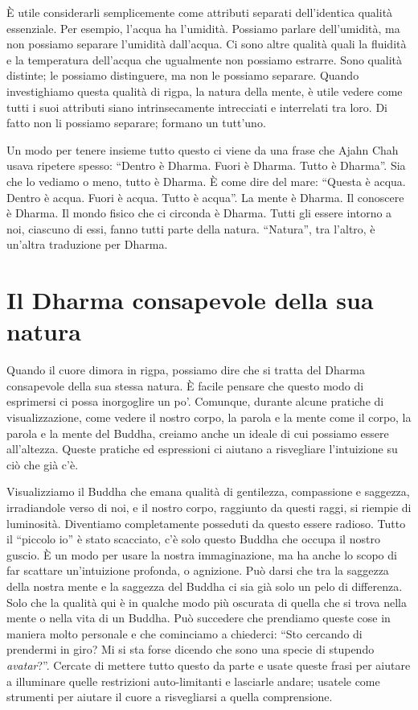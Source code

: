 È utile considerarli semplicemente come attributi separati dell'identica qualità essenziale. Per esempio, l'acqua ha l'umidità. Possiamo parlare dell'umidità, ma non possiamo separare l'umidità dall'acqua. Ci sono altre qualità quali la fluidità e la temperatura dell'acqua che ugualmente non possiamo estrarre. Sono qualità distinte; le possiamo distinguere, ma non le possiamo separare. Quando investighiamo questa qualità di rigpa, la natura della mente, è utile vedere come tutti i suoi attributi siano intrinsecamente intrecciati e interrelati tra loro. Di fatto non li possiamo separare; formano un tutt'uno.

Un modo per tenere insieme tutto questo ci viene da una frase che Ajahn Chah usava ripetere spesso: ``Dentro è Dharma. Fuori è Dharma. Tutto è Dharma''. Sia che lo vediamo o meno, tutto è Dharma. È come dire del mare: ``Questa è acqua. Dentro è acqua. Fuori è acqua. Tutto è acqua''. La mente è Dharma. Il conoscere è Dharma. Il mondo fisico che ci circonda è Dharma. Tutti gli essere intorno a noi, ciascuno di essi, fanno tutti parte della natura. ``Natura'', tra l'altro, è un'altra traduzione per Dharma.

\vspace*{-1.2em}
\section*{Il Dharma consapevole della sua natura}

\vspace*{-0.8em}
Quando il cuore dimora in rigpa, possiamo dire che si tratta del Dharma consapevole della sua stessa natura. È facile pensare che questo modo di esprimersi ci possa inorgoglire un po'. Comunque, durante alcune pratiche di visualizzazione, come vedere il nostro corpo, la parola e la mente come il corpo, la parola e la mente del Buddha, creiamo anche un ideale di cui possiamo essere all'altezza. Queste pratiche ed espressioni ci aiutano a risvegliare l'intuizione su ciò che già c'è.

Visualizziamo il Buddha che emana qualità di gentilezza, compassione e saggezza, irradiandole verso di noi, e il nostro corpo, raggiunto da questi raggi, si riempie di luminosità. Diventiamo completamente posseduti da questo essere radioso. Tutto il ``piccolo io'' è stato scacciato, c'è solo questo Buddha che occupa il nostro guscio. È un modo per usare la nostra immaginazione, ma ha anche lo scopo di far scattare un'intuizione profonda, o agnizione. Può darsi che tra la saggezza della nostra mente e la saggezza del Buddha ci sia già solo un pelo di differenza. Solo che la qualità qui è in qualche modo più oscurata di quella che si trova nella mente o nella vita di un Buddha. Può succedere che prendiamo queste cose in maniera molto personale e che cominciamo a chiederci: ``Sto cercando di prendermi in giro? Mi si sta forse dicendo che sono una specie di stupendo \textit{avatar}?''. Cercate di mettere tutto questo da parte e usate queste frasi per aiutare a illuminare quelle restrizioni auto-limitanti e lasciarle andare; usatele come strumenti per aiutare il cuore a risvegliarsi a quella comprensione. 

